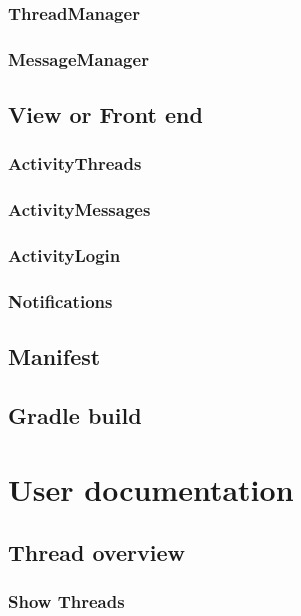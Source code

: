 \documentclass[12pt,a4paper,oneside]{report}
\begin{document}
\subsection{ThreadManager}

\subsection{MessageManager}

\section{View or Front end}

\subsection{ActivityThreads}

\subsection{ActivityMessages}

\subsection{ActivityLogin}

\subsection{Notifications}

\section{Manifest}

\section{Gradle build}

\chapter{User documentation}

\section{Thread overview}

\subsection{Show Threads}
\end{document}
